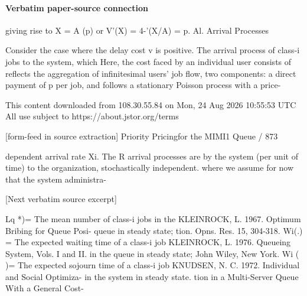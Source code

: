 \documentclass[10pt]{article}
\begin{document}
\paragraph{Verbatim paper-source connection}
\begin{ReviewVerbatim}
giving rise to X = A (p) or V'(X) = 4-'(X/A) = p.                     Al. Arrival Processes

  Consider the case where the delay cost v is positive.               The arrival process of class-i jobs to the system, which
Here, the cost faced by an individual user consists of                reflects the aggregation of infinitesimal users' job flow,
two components: a direct payment of p per job, and                    follows a stationary Poisson process with a price-




                                                 This content downloaded from
                               108.30.55.84 on Mon, 24 Aug 2026 10:55:53 UTC
                                         All use subject to https://about.jstor.org/terms

[form-feed in source extraction]
                                                                                Priority Pricingfor the MIMI1 Queue / 873

dependent arrival rate Xi. The R arrival processes are                 by the system (per unit of time) to the organization,
stochastically independent.                                            where we assume for now that the system administra-

[Next verbatim source excerpt]

 Lq *)= The mean number of class-i jobs in the                          KLEINROCK, L. 1967. Optimum Bribing for Queue Posi-
         queue in steady state;                                              tion. Opns. Res. 15, 304-318.
Wi(.) = The expected waiting time of a class-i job                      KLEINROCK, L. 1976. Queueing System, Vols. I and II.
         in the queue in steady state;                                       John Wiley, New York.
 Wi ( )= The expected sojourn time of a class-i job                     KNUDSEN, N. C. 1972. Individual and Social Optimiza-
         in the system in steady state.                                      tion in a Multi-Server Queue With a General Cost-
\end{ReviewVerbatim}
\end{document}
